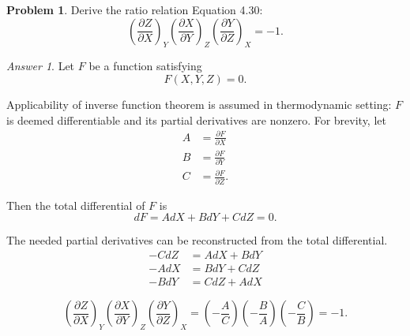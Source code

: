 \documentclass[a4paper, 12pt]{article}
\theoremstyle{definition}
\newtheorem{problem}{Problem}[section]
\theoremstyle{remark}
\newtheorem*{answer}{Answer}
\begin{document}
\begin{problem}
    Derive the ratio relation Equation 4.30:
    \[
        \left( \frac{\partial Z}{\partial X} \right)_Y
        \left( \frac{\partial X}{\partial Y} \right)_Z
        \left( \frac{\partial Y}{\partial Z} \right)_X
        = -1.
    \]

    \begin{answer}
        Let $F$ be a function satisfying
        \[ F(X, Y, Z) = 0.\]

        Applicability of inverse function theorem is assumed in thermodynamic
        setting: $F$ is deemed differentiable and its partial derivatives are
        nonzero.  For brevity, let
        \begin{align*}
            A &= \frac{\partial F}{\partial X} \\
            B &= \frac{\partial F}{\partial Y} \\
            C &= \frac{\partial F}{\partial Z}.
        \end{align*}

        Then the total differential of $F$ is
        \[ dF = AdX + BdY + CdZ = 0.\]

        The needed partial derivatives can be reconstructed from the total
        differential.
        \begin{align*}
            -CdZ &= AdX + BdY \\
            -AdX &= BdY + CdZ \\
            -BdY &= CdZ + AdX
        \end{align*}

        \[
            \left( \frac{\partial Z}{\partial X} \right)_Y
            \left( \frac{\partial X}{\partial Y} \right)_Z
            \left( \frac{\partial Y}{\partial Z} \right)_X
            = \left( -\frac AC \right)
              \left( -\frac BA \right)
              \left( -\frac CB \right)
            = -1.
        \]
    \end{answer}
\end{problem}
\end{document}
